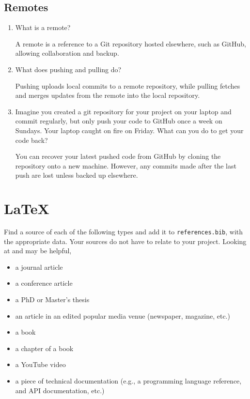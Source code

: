 \documentclass[10pt,twocolumn]{article}
\begin{document}
\subsection{Remotes}

\begin{enumerate}
\item What is a remote?

A remote is a reference to a Git repository hosted elsewhere, such as GitHub, allowing collaboration and backup.  

\item What does pushing and pulling do?

Pushing uploads local commits to a remote repository, while pulling fetches and merges updates from the remote into the local repository.  

\item Imagine you created a git repository for your project on your laptop and commit regularly, but only push your code to GitHub once a week on Sundays. Your laptop caught on fire on Friday. What can you do to get your code back?

You can recover your latest pushed code from GitHub by cloning the repository onto a new machine. However, any commits made after the last push are lost unless backed up elsewhere.  
\end{enumerate}


\section{\LaTeX}

Find a source of each of the following types and add it to \texttt{references.bib}, with the appropriate data. Your sources do not have to relate to your project. Looking at \textcite{OverleafBibliographyManagement} and \textcite{WikipediaBibtex} may be helpful,

\begin{itemize}
\item a journal article
\item a conference article
\item a PhD or Master's thesis
\item an article in an edited popular media venue (newspaper, magazine, etc.)
\item a book
\item a chapter of a book
\item a YouTube video
\item a piece of technical documentation (e.g., a programming language reference, and API documentation, etc.)
\end{itemize}
\end{document}

